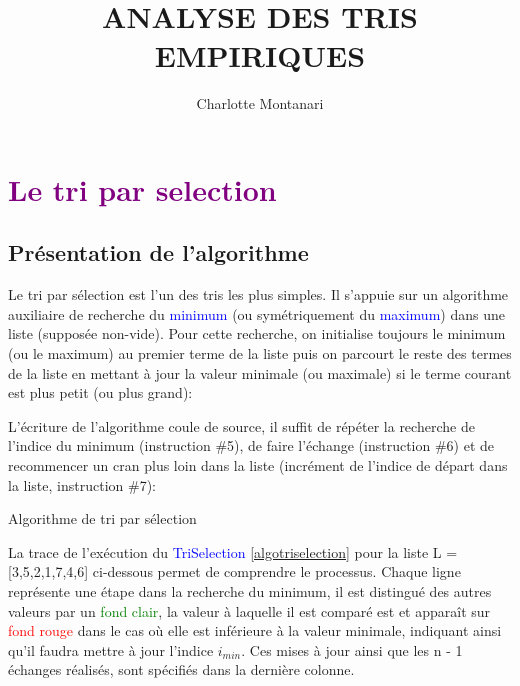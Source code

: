 \documentclass[a4paper,10pt]{article}
\title{\Huge\bfseries\MakeUppercase{Analyse des tris empiriques}}
\author{Charlotte Montanari}
\begin{document}
\maketitle 
\tableofcontents


\section{\textcolor{purple}{Le tri par selection}}
\subsection{Présentation de l'algorithme}
Le tri par sélection est l'un des tris les plus simples. 
Il s'appuie sur un algorithme auxiliaire de re­cher­che du \textcolor{blue}{minimum} (ou symétriquement 
du \textcolor{blue}{maximum}) dans une liste (supposée non-vide). 
Pour cette recherche, on initialise toujours le minimum (ou le maximum) 
au premier terme de la liste puis on parcourt le reste des termes de la liste en mettant à jour 
la valeur minimale (ou maximale) si le terme courant est plus petit (ou plus grand):


L'écriture de l'algorithme coule de source, il suffit de répéter la recherche de 
l'indice du minimum (instruction \#5), de faire l'échange (instruction \#6) et de 
recommencer un cran plus loin dans la liste (incrément de l'indice de départ dans la liste, instruction \#7):
\begin{center}
    
    Algorithme de tri par sélection\label{algotriselection}
\end{center}

La trace de l'exécution du \textcolor{blue}{TriSelection} \ref{algotriselection} pour la liste L = [3,5,2,1,7,4,6]
ci-dessous permet de comprendre le processus. Chaque ligne représente une étape dans la recherche du minimum, 
il est distingué des autres valeurs par un \textcolor{green}{fond clair}, la valeur à laquelle il est comparé 
est  et apparaît sur \textcolor{red}{fond rouge} dans le cas où elle est inférieure à la valeur minimale, 
indiquant ainsi qu'il faudra mettre à jour l'indice $i_{min}$. Ces mises à jour ainsi que les n - 1 échanges réalisés, 
sont spé­ci­fiés dans la dernière colonne.
\end{document}
